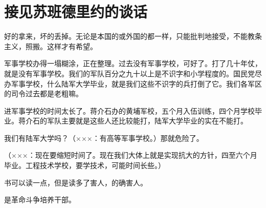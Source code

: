\section[接见苏班德里约的谈话（一九六五年一月二十七日）]{接见苏班德里约的谈话}


好的拿来，坏的丢掉。无论是本国的或外国的都一样，只能批判地接受，不能教条主义，照搬。这样才有希望。

军事学校办得一塌糊涂，正在整理。过去没有军事学校，可好了。打了几十年仗，就是没有军事学校。我们的军队百分之九十以上是不识字和小学程度的。国民党尽办军事学校，什么陆军大学毕业，就是我们这些不识字的兵打倒了它。我们各军区的司令过去都是老粗嘛。

进军事学校的时间太长了。蒋介石办的黄埔军校，五个月入伍训练，四个月学校毕业。蒋介石的军队主要就是这些人还比较能打，陆军大学毕业的实在不能打。

我们有陆军大学吗？（×××：有高等军事学校。）那就危险了。

（×××：现在要缩短时间了。现在我们大体上就是实现抗大的方针，四至六个月毕业。工程技术学校，要学技术，可能时间长些。）

书可以读一点，但是读多了害人，的确害人。

是革命斗争培养干部。

